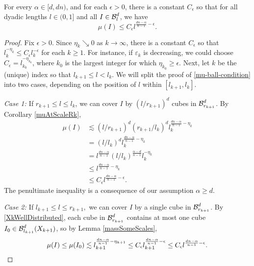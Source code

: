 \begin{lemma} \label{frostmanBound}
For every $\alpha \in [d, dn)$, and for each $\epsilon>0$, there is a constant $C_\epsilon$ so that for all dyadic lengths $l\in (0,1]$ and all $I \in \operatorname{\mathcal{B}}_l^d$, we have
	\begin{equation} 
	\mu(I) \leq C_{\epsilon} l^{\frac{dn - \alpha}{n - 1} - \epsilon}. \label{mu-ball-condition} 
	\end{equation} 
\end{lemma}
\begin{proof}
	Fix $\epsilon > 0$. Since $\eta_k \searrow 0$ as $k\to\infty$, there is a constant $C_{\epsilon}$ so that $l_k^{-\eta_k}\leq C_{\epsilon}l_k^{-\epsilon}$ for each $k \geq 1$. For instance, if $\varepsilon_k$ is decreasing, we could choose $C_{\epsilon}=l_{k_0}^{-\eta_{k_0}}$, where $k_0$ is the largest integer for which $\eta_{k_0} \geq \epsilon$. Next, let $k$ be the (unique) index so that $l_{k+1}\leq l < l_{k}$. We will split the proof of \eqref{mu-ball-condition} into two cases, depending on the position of  $l$ within $[l_{k+1}, l_k]$. 

	{\em{Case 1: }} If $r_{k+1} \leq l \leq l_k$, 
	we can cover $I$ by $(l/r_{k+1})^d$ cubes in $\operatorname{\mathcal{B}}^d_{r_{k+1}}$. By Corollary \ref{muAtScaleRk},
	\begin{equation}
	\begin{split}
	\mu(I) & \lesssim (l/r_{k+1})^d (r_{k+1}/l_k)^d l_k^{\frac{dn-\alpha}{n-1}-\eta_k} \\
	& = (l/l_k)^d l_k^{\frac{dn-\alpha}{n-1}-\eta_{k}}\\
	& = l^{\frac{dn-\alpha}{n-1}} (l/l_k)^{\frac{\alpha - d}{n-1}} l_k^{-\eta_k}\\
	& \leq l^{\frac{dn-\alpha}{n-1} - \eta_k}  \\
	& \leq C_{\epsilon}l^{\frac{dn-\alpha}{n-1}-\epsilon}.
	\end{split}
	\end{equation}
The penultimate inequality is a consequence of our assumption $\alpha \geq d$. 

	{\em{Case 2: }} If $l_{k+1} \leq l \leq r_{k+1},$ we can cover $I$ by a single cube in $\operatorname{\mathcal{B}}^d_{r_{k+1}}$. By \eqref{XkWellDistributed}, each cube in $\operatorname{\mathcal{B}}^d_{r_{k+1}}$ contains at most one cube $I_0 \in \operatorname{\mathcal{B}}^d_{l_{k+1}}(X_{k+1})$, so by Lemma \ref{massSomeScales},
	\[ 
		\mu(I) \leq \mu(I_0) \lesssim l_{k+1}^{\frac{dn - \alpha}{n - 1} - \eta_{k+1}} 
		\leq C_{\epsilon}l_{k+1}^{\frac{dn - \alpha}{n - 1} - \epsilon}
		\leq C_{\epsilon}l^{\frac{dn - \alpha}{n - 1} - \epsilon}.\qedhere
	\]

\end{proof}

